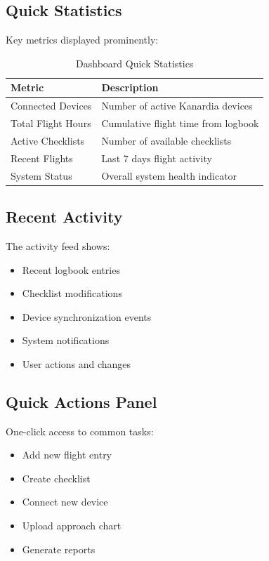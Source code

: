 \subsection{Quick Statistics}

Key metrics displayed prominently:

\begin{table}[H]
\centering
\begin{tabular}{@{}lp{8cm}@{}}
\toprule
\textbf{Metric} & \textbf{Description} \\
\midrule
Connected Devices & Number of active Kanardia devices \\
Total Flight Hours & Cumulative flight time from logbook \\
Active Checklists & Number of available checklists \\
Recent Flights & Last 7 days flight activity \\
System Status & Overall system health indicator \\
\bottomrule
\end{tabular}
\caption{Dashboard Quick Statistics}
\label{tab:dashboard_stats}
\end{table}

\subsection{Recent Activity}

The activity feed shows:
\begin{itemize}
    \item Recent logbook entries
    \item Checklist modifications
    \item Device synchronization events
    \item System notifications
    \item User actions and changes
\end{itemize}

\subsection{Quick Actions Panel}

One-click access to common tasks:
\begin{itemize}
    \item Add new flight entry
    \item Create checklist
    \item Connect new device
    \item Upload approach chart
    \item Generate reports
\end{itemize}

